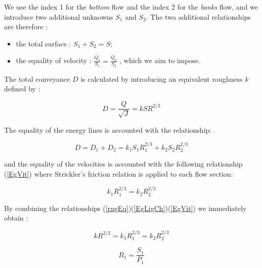 \vspace{0.5cm}

We use the index 1 for the \textit{bottom} flow and the index 2 for the \textit{banks} flow, and we introduce two additional unknowns $S_1$ and $S_2$. The two additional relationships are therefore :

\begin{itemize}
 \item the total surface : $S_1 + S_2 = S$;
 \item the equality of velocity : $\frac{Q_1}{S_1}=\frac{Q_2}{S_2}$ , which we aim to impose.
\end{itemize}

\vspace{0.5cm}

The total conveyance $D$ is calculated by introducing an equivalent roughness $k$ defined by :

\begin{equation}
  \label{rugEq}
  D = \frac{Q}{\sqrt{J}}= k S R^{2/3}
\end{equation}

\vspace{0.5cm}

The equality of the energy lines is accounted with the relationship:

\begin{equation}
  \label{EgLigCh}
  D = D_1 + D_2 = k_1 S_1 R_{1}^{2/3} + k_2 S_2 R_{2}^{2/3}
\end{equation}

and the equality of the velocities is accounted with the following relationship (\ref{EgVit}) where Strickler's friction relation is applied to each flow section:

\begin{equation}
  \label{EgVit}
  k_1 R_{1}^{2/3} = k_2 R_{2}^{2/3}
\end{equation}

\vspace{0.5cm}


By combining the relationships (\ref{rugEq})(\ref{EgLigCh})(\ref{EgVit}) we immediately obtain :

\begin{equation}
  k R^{2/3} = k_1 R_{1}^{2/3} = k_2 R_{2}^{2/3}
\end{equation}

\begin{equation}
  R_1 = \frac{S_1}{P_1}
\end{equation}

